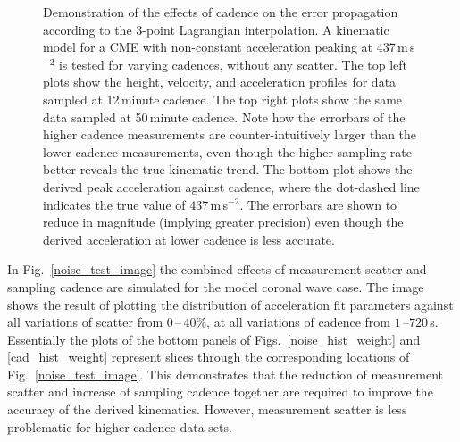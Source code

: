 \documentclass[structabstract]{aa}
\begin{document}
\begin{figure}[!ht]
\caption{Demonstration of the effects of cadence on the error propagation according to the 3-point Lagrangian interpolation. A kinematic model for a CME with non-constant acceleration peaking at 437\,m\,s$^{-2}$ is tested for varying cadences, without any scatter. The top left plots show the height, velocity, and acceleration profiles for data sampled at 12\,minute cadence. The top right plots show the same data sampled at 50\,minute cadence. Note how the errorbars of the higher cadence measurements are counter-intuitively larger than the lower cadence measurements, even though the higher sampling rate better reveals the true kinematic trend. The bottom plot shows the derived peak acceleration against cadence, where the dot-dashed line indicates the true value of 437\,m\,s$^{-2}$. The errorbars are shown to reduce in magnitude (implying greater precision) even though the derived acceleration at lower cadence is less accurate.}
\label{fig_cadence_hva}
\end{figure}

In Fig.~\ref{noise_test_image} the combined effects of measurement scatter and sampling cadence are simulated for the model coronal wave case. The image shows the result of plotting the distribution of acceleration fit parameters against all variations of scatter from $0$\,--\,$40\%$, at all variations of cadence from $1$\,--$720$\,s. Essentially the plots of the bottom panels of Figs.~\ref{noise_hist_weight} and \ref{cad_hist_weight} represent slices through the corresponding locations of Fig.~\ref{noise_test_image}. This demonstrates that the reduction of measurement scatter and increase of sampling cadence together are required to improve the accuracy of the derived kinematics. However, measurement scatter is less problematic for higher cadence data sets.
\end{document}
